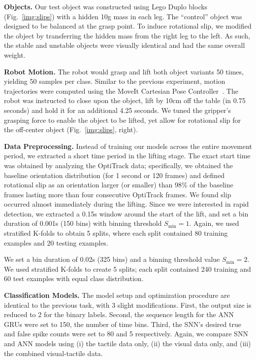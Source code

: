 \documentclass[fyp]{socreport}
\begin{document}
\noindent\textbf{Objects.} Our test object was constructed using Lego Duplo
blocks (Fig.~\ref{img:slips}) with a hidden 10g mass in each leg. The
``control'' object was designed to be balanced at the grasp point. To induce
rotational slip, we modified the object by transferring the hidden mass from the
right leg to the left. As such, the stable and unstable objects were visually
identical and had the same overall weight.

\vspace{0.3em}
\noindent\textbf{Robot Motion.} The robot would grasp and lift both object
variants 50 times, yielding 50 samples per class. Similar to the previous
experiment, motion trajectories were computed using the MoveIt Cartesian Pose
Controller~\cite{coleman2014reducing}. The robot was instructed to close upon
the object, lift by 10cm off the table (in 0.75 seconds) and hold it for an
additional 4.25 seconds. We tuned the gripper's grasping force to enable the
object to be lifted, yet allow for rotational slip for the off-center object
(Fig.~\ref{img:slips}, right).

\vspace{0.3em}
\noindent\textbf{Data Preprocessing.} Instead of training our models across the
entire movement period, we extracted a short time period in the lifting stage.
The exact start time was obtained by analyzing the OptiTrack data; specifically,
we obtained the baseline orientation distribution (for 1 second or 120 frames)
and defined rotational slip as an orientation larger (or smaller) than 98\% of
the baseline frames lasting more than four consecutive OptiTrack frames. We
found slip occurred almost immediately during the lifting. Since we were
interested in rapid detection, we extracted a 0.15s window around the start of
the lift, and set a bin duration of 0.001s (150 bins) with binning threshold
$S_\text{min} = 1$. Again, we used stratified K-folds to obtain 5 splits, where
each split contained 80 training examples and 20 testing examples.

We set a bin duration of 0.02s (325 bins) and a binning threshold value
$S_{\text{min}} = 2$. We used stratified K-folds to create 5 splits; each split
contained 240 training and 60 test examples with equal class distribution.

\vspace{0.3em}
\noindent\textbf{Classification Models.} The model setup and optimization
procedure are identical to the previous task, with 3 slight modifications.
First, the output size is reduced to 2 for the binary labels. Second, the
sequence length for the ANN GRUs were set to 150, the number of time bins.
Third, the SNN's desired true and false spike counts were set to 80 and 5
respectively. Again, we compare SNN and ANN models using (i) the tactile data
only, (ii) the visual data only, and (iii) the combined visual-tactile data.
\end{document}
